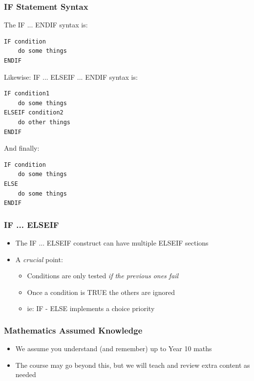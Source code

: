 \documentclass[14pt]{beamer}
\begin{document}
\begin{frame}[fragile]
\frametitle{IF Statement Syntax}
\begin{multicols}{2}
\begin{itemize}
\footnotesize{
\item The IF ... ENDIF syntax is:
\begin{lstlisting}[style=pseudo]
IF condition
	do some things
ENDIF
\end{lstlisting}

\item Likewise: IF ... ELSEIF ... ENDIF syntax is:
\begin{lstlisting}[style=pseudo]
IF condition1
	do some things
ELSEIF condition2
	do other things
ENDIF
\end{lstlisting}
\columnbreak
\item And finally:
\begin{lstlisting}[style=pseudo]
IF condition
	do some things
ELSE
	do some things
ENDIF
\end{lstlisting}
}
\end{itemize}
\end{multicols}
\end{frame}

\begin{frame}[fragile]
\frametitle{IF ... ELSEIF}
\begin{itemize}
\item The IF ... ELSEIF construct can have multiple ELSEIF sections
\item A \textit{crucial} point:
	\begin{itemize}
		\item Conditions are only tested \textit{if the previous ones fail}
		\item Once a condition is TRUE the others are ignored
		\item ie: IF - ELSE implements a choice priority
	\end{itemize}
\end{itemize}
\end{frame}

\begin{frame}
\frametitle{Mathematics Assumed Knowledge}
\begin{itemize}
\item We assume you understand (and remember) up to Year 10 maths
\item The course may go beyond this, but we will teach and review extra content as needed
\end{itemize}
\end{frame}
\end{document}
